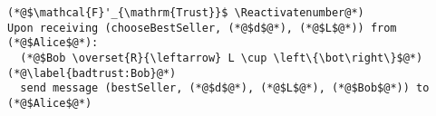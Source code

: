 \Suppressnumber
\begin{lstlisting}[label=badtrustfunc, style=numbers]
(*@$\mathcal{F}'_{\mathrm{Trust}}$ \Reactivatenumber@*)
Upon receiving (chooseBestSeller, (*@$d$@*), (*@$L$@*)) from (*@$Alice$@*):
  (*@$Bob \overset{R}{\leftarrow} L \cup \left\{\bot\right\}$@*) (*@\label{badtrust:Bob}@*)
  send message (bestSeller, (*@$d$@*), (*@$L$@*), (*@$Bob$@*)) to (*@$Alice$@*)
\end{lstlisting}
